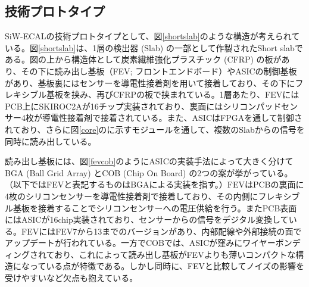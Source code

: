 \subsection{技術プロトタイプ}
SiW-ECALの技術プロトタイプとして、図\ref{shortslab}のような構造が考えられている。図\ref{shortslab}は、1層の検出器 (Slab) の一部として作製されたShort slabである。図の上から構造体として炭素繊維強化プラスチック (CFRP) の板があり、その下に読み出し基板（FEV; フロントエンドボード）やASICの制御基板があり、基板裏にはセンサーを導電性接着剤を用いて接着しており、その下にフレキシブル基板を挟み、再びCFRPの板で挟まれている。1層あたり、FEVにはPCB上にSKIROC2Aが16チップ実装されており、裏面にはシリコンパッドセンサー4枚が導電性接着剤で接着されている。また、ASICはFPGAを通して制御されており、さらに図\ref{core}のに示すモジュールを通して、複数のSlabからの信号を同時に読み出している。

読み出し基板には、図\ref{fevcob}のようにASICの実装手法によって大きく分けてBGA (Ball Grid Array) とCOB (Chip On Board) の2つの案が挙がっている。（以下ではFEVと表記するものはBGAによる実装を指す。）FEVはPCBの裏面に4枚のシリコンセンサーを導電性接着剤で接着しており、その内側にフレキシブル基板を接着することでシリコンセンサーへの電圧供給を行う。またPCB表面にはASICが16chip実装されており、センサーからの信号をデジタル変換している。FEVにはFEV7から13までのバージョンがあり、内部配線や外部接続の面でアップデートが行われている。一方でCOBでは、ASICが窪みにワイヤーボンディングされており、これによって読み出し基板がFEVよりも薄いコンパクトな構造になっている点が特徴である。しかし同時に、FEVと比較してノイズの影響を受けやすいなど欠点も抱えている。


